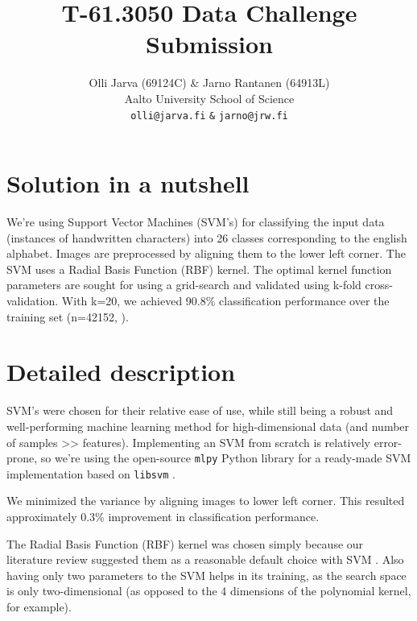 \documentclass{netsec2012}
\begin{document}

\title{T-61.3050 Data Challenge Submission}

\author{Olli Jarva (69124C) \& Jarno Rantanen (64913L) \\
        Aalto University School of Science \\
	\texttt{olli@jarva.fi} \texttt{\&} \texttt{jarno@jrw.fi}}
\maketitle


\section{Solution in a nutshell}

We're using Support Vector Machines (SVM's) for classifying the input data (instances of 
handwritten characters) into 26 classes corresponding to the english alphabet. Images are 
preprocessed by aligning them to the lower left corner. The SVM uses a Radial Basis Function 
(RBF) kernel. The optimal kernel function parameters are sought for using 
a grid-search and validated using k-fold cross-validation. With k=20, we achieved 90.8\% 
classification performance over the training set (n=42152, \cite{training_set}).

\section{Detailed description}

SVM's were chosen for their relative ease of use, while still being a robust and well-performing 
machine learning method for high-dimensional data (and number of samples >> features).  Implementing an SVM from scratch is 
relatively error-prone, so we're using the open-source \texttt{mlpy} \cite{mlpy} Python library for a 
ready-made SVM implementation based on \texttt{libsvm} \cite{libsvm}.

We minimized the variance by aligning images to lower left corner. This resulted approximately 0.3\%
improvement in classification performance.

The Radial Basis Function (RBF) kernel was chosen simply because our literature review suggested 
them as a reasonable default choice with SVM \cite{libsvm_guide,svm_chemistry}.  Also having only two parameters to the SVM helps in 
its training, as the search space is only two-dimensional (as opposed to the 4 dimensions of the 
polynomial kernel, for example). 
\end{document}
